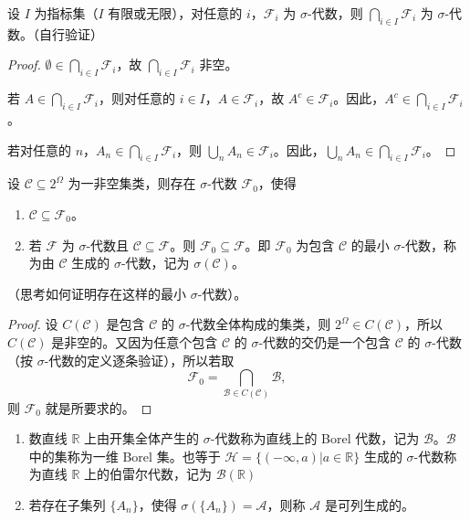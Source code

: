 \documentclass[lang=cn,10pt,thmcnt=section]{elegantbook}
\begin{document}
\begin{proposition}
	设 \(I\) 为指标集（\(I\) 有限或无限），对任意的 \(i\)，\(\mathscr{F}_i\) 为 \(\sigma\)-代数，则 \(\bigcap_{i \in I} \mathscr{F}_i\) 为 \(\sigma\)-代数。（自行验证）
\end{proposition}
\begin{proof}
	\(\emptyset \in \bigcap_{i \in I} \mathscr{F}_i\)，故 \(\bigcap_{i \in I} \mathscr{F}_i\) 非空。

若 \(A \in \bigcap_{i \in I} \mathscr{F}_i\)，则对任意的 \(i \in I\)，\(A \in \mathscr{F}_i\)，故 \(A^c \in \mathscr{F}_i\)。因此，\(A^c \in \bigcap_{i \in I} \mathscr{F}_i\)。

若对任意的 \(n\)，\(A_n \in \bigcap_{i \in I} \mathscr{F}_i\)，则 \(\bigcup_{n} A_n \in \mathscr{F}_i\)。因此，\(\bigcup_{n} A_n \in \bigcap_{i \in I} \mathscr{F}_i\)。
\end{proof}
\begin{theorem}
	设 \(\mathscr{C} \subseteq 2^\Omega\) 为一非空集类，则存在 \(\sigma\)-代数 \(\mathscr{F}_0\)，使得
\begin{enumerate}
    \item \(\mathscr{C} \subseteq \mathscr{F}_0\)。
    \item 若 \(\mathscr{F}\) 为 \(\sigma\)-代数且 \(\mathscr{C} \subseteq \mathscr{F}\)。则 \(\mathscr{F}_0 \subseteq \mathscr{F}\)。即 \(\mathscr{F}_0\) 为包含 \(\mathscr{C}\) 的最小 \(\sigma\)-代数，称为由 \(\mathscr{C}\) 生成的 \(\sigma\)-代数，记为 \(\sigma(\mathscr{C})\)。
\end{enumerate}
（思考如何证明存在这样的最小 \(\sigma\)-代数）。
\end{theorem}
\begin{proof}
	设 \(C(\mathscr{C})\) 是包含 \(\mathscr{C}\) 的 \(\sigma\)-代数全体构成的集类，则 \(2^\Omega \in C(\mathscr{C})\)，所以 \(C(\mathscr{C})\) 是非空的。又因为任意个包含 \(\mathscr{C}\) 的 \(\sigma\)-代数的交仍是一个包含 \(\mathscr{C}\) 的 \(\sigma\)-代数（按 \(\sigma\)-代数的定义逐条验证），所以若取
\[
\mathscr{F}_0 = \bigcap_{\mathscr{B} \in C(\mathscr{C})} \mathscr{B},
\]
则 \(\mathscr{F}_0\) 就是所要求的。
\end{proof}
\begin{definition}
	\begin{enumerate}
		\item 数直线 \(\mathbb{R}\) 上由开集全体产生的 \(\sigma\)-代数称为直线上的 Borel 代数，记为 \(\mathscr{B}\)。\(\mathscr{B}\) 中的集称为一维 Borel 集。也等于 \(\mathcal{H} = \{(-\infty, a) | a \in \mathbb{R}\}\) 生成的 \(\sigma\)-代数称为直线 \(\mathbb{R}\) 上的伯雷尔代数，记为 \(\mathcal{B}(\mathbb{R})\)
		\item 若存在子集列 \(\{A_n\}\)，使得 \(\sigma(\{A_n\}) = \mathscr{A}\)，则称 \(\mathscr{A}\) 是可列生成的。
	\end{enumerate}
\end{definition}
\end{document}
